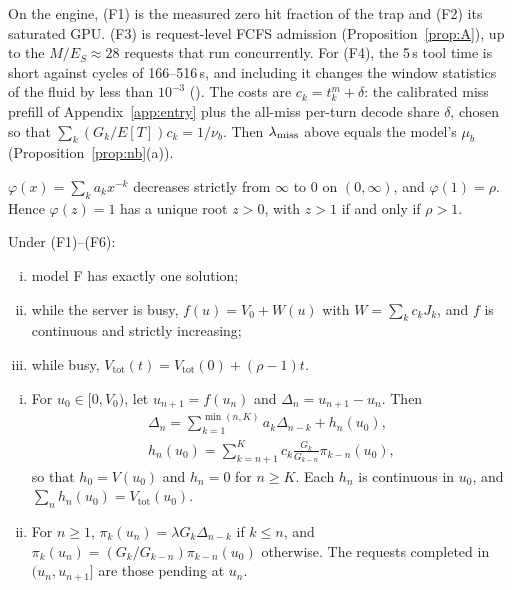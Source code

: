 On the engine, (F1) is the measured zero hit fraction of the trap and (F2) its saturated GPU. (F3) is request-level FCFS
admission (Proposition~\ref{prop:A}), up to the $M/E_S\approx28$ requests that run concurrently. For (F4), the 5\,s tool
time is short against cycles of 166--516\,s, and including it changes the window statistics of the fluid by less than
$10^{-3}$ (). The costs are $c_k=t^m_k+\delta$: the calibrated miss prefill of
Appendix~\ref{app:entry} plus the all-miss per-turn decode share $\delta$, chosen so that $\sum_k(G_k/E[T])c_k=1/\nu_b$. Then
$\lambda_{\mathrm{miss}}$ above equals the model's $\mu_b$ (Proposition~\ref{prop:nb}(a)).

\begin{lemma}\label{lem:perron}
$\varphi(x)=\sum_ka_kx^{-k}$ decreases strictly from $\infty$ to $0$ on $(0,\infty)$, and $\varphi(1)=\rho$. Hence
$\varphi(z)=1$ has a unique root $z>0$, with $z>1$ if and only if $\rho>1$.
\end{lemma}

\begin{lemma}\label{lem:orbit}
Under (F1)--(F6):
\begin{enumerate}[(i),leftmargin=*,nosep]
\item model F has exactly one solution;
\item while the server is busy, $f(u)=V_0+W(u)$ with $W=\sum_kc_kJ_k$, and $f$ is continuous and strictly increasing;
\item while busy, $V_{\mathrm{tot}}(t)=V_{\mathrm{tot}}(0)+(\rho-1)t$.
\end{enumerate}
\begin{enumerate}[(i),leftmargin=*,nosep,resume]
\item For $u_0\in[0,V_0)$, let $u_{n+1}=f(u_n)$ and $\Delta_n=u_{n+1}-u_n$. Then
\begin{gather*}
\Delta_n=\sum_{k=1}^{\min(n,K)}a_k\Delta_{n-k}+h_n(u_0),\\
h_n(u_0)=\sum_{k=n+1}^{K}c_k\frac{G_k}{G_{k-n}}\pi_{k-n}(u_0),
\end{gather*}
so that $h_0=V(u_0)$ and $h_n=0$ for $n\ge K$. Each $h_n$ is continuous in $u_0$, and $\sum_nh_n(u_0)=V_{\mathrm{tot}}(u_0)$.
\item For $n\ge1$, $\pi_k(u_n)=\lambda G_k\Delta_{n-k}$ if $k\le n$, and $\pi_k(u_n)=(G_k/G_{k-n})\pi_{k-n}(u_0)$ otherwise.
The requests completed in $(u_n,u_{n+1}]$ are those pending at $u_n$.
\end{enumerate}
\end{lemma}

